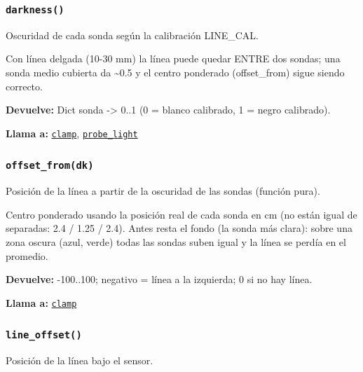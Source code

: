 \subsubsection{\texttt{darkness()}}\label{fn:hal:darkness}
\noindent Oscuridad de cada sonda según la calibración LINE\_CAL.

Con línea delgada (10-30 mm) la línea puede quedar ENTRE dos sondas; una sonda medio cubierta da \textasciitilde{}0.5 y el centro ponderado (offset\_from) sigue siendo correcto.

\noindent\textbf{Devuelve:} Dict sonda -> 0..1 (0 = blanco calibrado, 1 = negro calibrado).\par
\noindent\textbf{Llama a:} \hyperref[fn:hal:clamp]{\texttt{clamp}}, \hyperref[fn:hal:probe-light]{\texttt{probe\_\allowbreak{}light}}\par

\subsubsection{\texttt{offset\_\allowbreak{}from(dk)}}\label{fn:hal:offset-from}
\noindent Posición de la línea a partir de la oscuridad de las sondas (función pura).

Centro ponderado usando la posición real de cada sonda en cm (no están igual de separadas: 2.4 / 1.25 / 2.4). Antes resta el fondo (la sonda más clara): sobre una zona oscura (azul, verde) todas las sondas suben igual y la línea se perdía en el promedio.

\par{}\par\smallskip
\noindent\textbf{Devuelve:} -100..100; negativo = línea a la izquierda; 0 si no hay línea.\par
\noindent\textbf{Llama a:} \hyperref[fn:hal:clamp]{\texttt{clamp}}\par

\subsubsection{\texttt{line\_\allowbreak{}offset()}}\label{fn:hal:line-offset}
\noindent Posición de la línea bajo el sensor.

